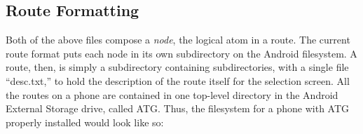\subsection{Route Formatting}
Both of the above files compose a \emph{node}, the logical atom in a route. The current route format puts each node in its own subdirectory
on the Android filesystem. A route, then, is simply a subdirectory containing subdirectories, with a single file ``desc.txt,'' to hold the
description of the route itself for the selection screen. All the routes on a phone are contained in one top-level directory in the
Android External Storage drive, called ATG. Thus, the filesystem for a phone with ATG properly installed would look like so:\vspace{.1pt}

